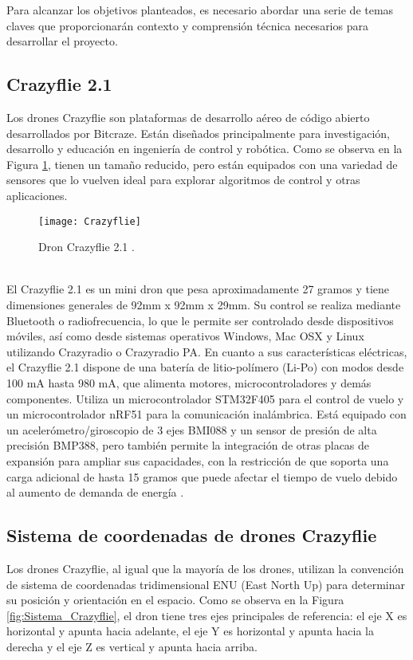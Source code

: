 Para alcanzar los objetivos planteados, es necesario abordar una serie de temas claves que proporcionarán contexto y comprensión técnica necesarios para desarrollar el proyecto. 

\subsection*{Crazyflie 2.1 }
Los drones Crazyflie son plataformas de desarrollo aéreo de código abierto desarrollados por Bitcraze. Están diseñados principalmente para investigación, desarrollo y educación en ingeniería de control y robótica. Como se observa en la Figura \ref{fig:Crazyflie}, tienen un tamaño reducido, pero están equipados con una variedad de sensores que lo vuelven ideal para explorar algoritmos de control y otras aplicaciones. 
\begin{figure}[htbp]
	\centering
	\texttt{[image: Crazyflie]}
	\caption{Dron Crazyflie 2.1 \cite{Crazyflie}.}
	\label{fig:Crazyflie}
\end{figure}
\\El Crazyflie 2.1 es un mini dron que pesa aproximadamente 27 gramos y tiene dimensiones generales de 92mm x 92mm x 29mm. Su control se realiza mediante Bluetooth o radiofrecuencia, lo que le permite ser controlado desde dispositivos móviles, así como desde sistemas operativos Windows, Mac OSX y Linux utilizando Crazyradio o Crazyradio PA. En cuanto a sus características eléctricas, el Crazyflie 2.1 dispone de una batería de litio-polímero (Li-Po) con modos desde 100 mA hasta 980 mA, que alimenta motores, microcontroladores y demás componentes. Utiliza un microcontrolador STM32F405 para el control de vuelo y un microcontrolador nRF51 para la comunicación inalámbrica. Está equipado con un acelerómetro/giroscopio de 3 ejes BMI088 y un sensor de presión de alta precisión BMP388, pero también permite la integración de otras placas de expansión para ampliar sus capacidades, con la restricción de que soporta una carga adicional de hasta 15 gramos que puede afectar el tiempo de vuelo debido al aumento de demanda de energía \cite{Crazyflie}. 

\subsection*{Sistema de coordenadas de drones Crazyflie}
Los drones Crazyflie, al igual que la mayoría de los drones, utilizan la convención de sistema de coordenadas tridimensional ENU (East North Up) para determinar su posición y orientación en el espacio. Como se observa en la Figura \ref{fig:Sistema_Crazyflie}, el dron tiene tres ejes principales de referencia: el eje X es horizontal y apunta hacia adelante, el eje Y es horizontal y apunta hacia la derecha y el eje Z es vertical y apunta hacia arriba. 

